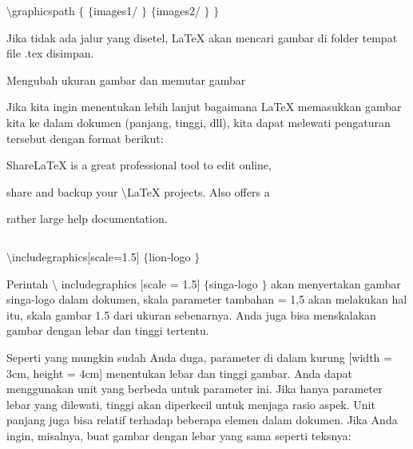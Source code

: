 \vspace{12pt}
\noindent 
 $  \setminus  $graphicspath $  \{  $  $  \{  $images1/ $  \}  $ $  \{  $images2/ $  \}  $  $  \}  $ \par
\noindent 
\vspace{\baselineskip}
\vspace{12pt}
\noindent 
Jika tidak ada jalur yang disetel, LaTeX akan mencari gambar di folder tempat file .tex disimpan. \par
\vspace{18pt}
\noindent 
{\fontsize{14pt}{14pt}\selectfont Mengubah ukuran gambar dan memutar gambar \\} \par
\vspace{12pt}
\noindent 
Jika kita ingin menentukan lebih lanjut bagaimana LaTeX memasukkan gambar kita ke dalam dokumen (panjang, tinggi, dll), kita dapat melewati pengaturan tersebut dengan format berikut: \par
\vspace{16pt}
\noindent 
ShareLaTeX is a great professional tool to edit online,  \par
\vspace{12pt}
\noindent 
share and backup your  $  \setminus  $LaTeX projects. Also offers a \par
\noindent 
  \par
\noindent 
rather large help documentation. \par
\noindent 
 $  $ \par
\noindent 
 $  \setminus  $includegraphics[scale=1.5] $  \{  $lion-logo $  \}  $ \par
\vspace{16pt}
\vspace{16pt}
\noindent 
Perintah  $  \setminus  $ includegraphics [scale = 1.5]  $  \{  $singa-logo $  \}  $ akan menyertakan gambar singa-logo dalam dokumen, skala parameter tambahan = 1,5 akan melakukan hal itu, skala gambar 1.5 dari ukuran sebenarnya. Anda juga bisa menskalakan gambar dengan lebar dan tinggi tertentu. \par
\vspace{16pt}
\noindent 
Seperti yang mungkin sudah Anda duga, parameter di dalam kurung [width = 3cm, height = 4cm] menentukan lebar dan tinggi gambar. Anda dapat menggunakan unit yang berbeda untuk parameter ini. Jika hanya parameter lebar yang dilewati, tinggi akan diperkecil untuk menjaga rasio aspek. Unit panjang juga bisa relatif terhadap beberapa elemen dalam dokumen. Jika Anda ingin, misalnya, buat gambar dengan lebar yang sama seperti teksnya: \par
